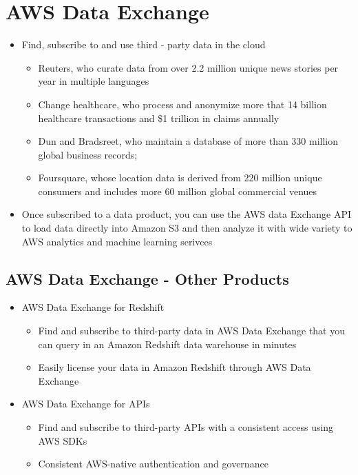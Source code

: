 \section{AWS Data Exchange}
\begin{itemize}
    \item Find, subscribe to and use third - party data in the cloud
    \begin{itemize}
        \item Reuters, who curate data from over 2.2 million unique news stories per year in multiple languages
        \item Change healthcare, who process and anonymize more that 14 billion healthcare transactions and \$1 trillion in claims annually
        \item Dun and Bradsreet, who maintain a database of more than 330 million global business records;
        \item Foursquare, whose location data is derived from 220 million unique consumers and includes more 60 million global commercial venues
    \end{itemize}
    \item Once subscribed to a data product, you can use the AWS data Exchange API to load data directly into Amazon S3 and then analyze it with wide variety to AWS analytics and machine learning serivces
\end{itemize}

\subsection{AWS Data Exchange - Other Products}
\begin{itemize}
    \item AWS Data Exchange for Redshift
    \begin{itemize}
        \item Find and subscribe to third-party data in AWS Data Exchange that you can query in an Amazon Redshift data warehouse in minutes
        \item Easily license your data in Amazon Redshift through AWS Data Exchange
    \end{itemize}
    \item AWS Data Exchange for APIs
    \begin{itemize}
        \item Find and subscribe to third-party APIs with a consistent access using AWS SDKs
        \item Consistent AWS-native authentication and governance
    \end{itemize}
\end{itemize}


